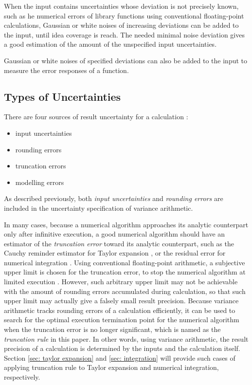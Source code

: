 \documentclass[twoside]{article}
\numberwithin{equation}{section}
\begin{document}
When the input contains uncertainties whose deviation is not precisely known, such as he numerical errors of library functions using conventional floating-point calculations, Gaussian or white noises of increasing deviations can be added to the input, until idea coverage is reach.
The needed minimal noise deviation gives a good estimation of the amount of the unspecified input uncertainties.

Gaussian or white noises of specified deviations can also be added to the input to measure the error responses of a function.



\subsection{Types of Uncertainties \cite{Prev_Precision_Arithmetic}}

There are four sources of result uncertainty for a calculation \cite{Statistical_Methods}\cite{Numerical_Recipes}:
\begin{itemize}
\item input uncertainties
\item rounding errors
\item truncation errors
\item modelling errors
\end{itemize}

As described previously, both \emph{input uncertainties} and \emph{rounding errors} are included in the uncertainty specification of variance arithmetic.

In many cases, because a numerical algorithm approaches its analytic counterpart only after infinitive execution, a good numerical algorithm should have an estimator of the \emph{truncation error} toward its analytic counterpart, such as the Cauchy reminder estimator for Taylor expansion \cite{Numerical_Recipes}, or the residual error for numerical integration \cite{Numerical_Recipes}.  
Using conventional floating-point arithmetic, a subjective upper limit is chosen for the truncation error, to stop the numerical algorithm at limited execution \cite{Numerical_Recipes}. 
However, such arbitrary upper limit may not be achievable with the amount of rounding errors accumulated during calculation, so that such upper limit may actually give a falsely small result precision. 
Because variance arithmetic tracks rounding errors of a calculation efficiently, it can be used to search for the optimal execution termination point for the numerical algorithm when the truncation error is no longer significant, which is named as the \emph{truncation rule} in this paper. In other words, using variance arithmetic, the result precision of a calculation is determined by the inputs and the calculation itself.  
Section \ref{sec: taylor expansion} and \ref{sec: integration} will provide such cases of applying truncation rule to Taylor expansion and numerical integration, respectively.
\end{document}
